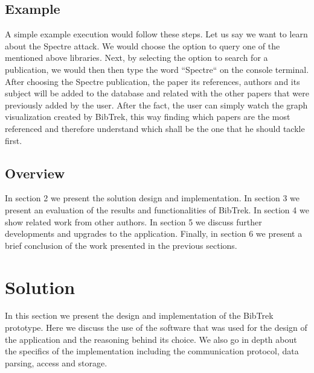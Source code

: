 \documentclass[twocolumn]{article}
\begin{document}
\subsection{Example}
A simple example execution would follow these steps. Let us say we want to learn about the Spectre attack. We would choose the option to query one of the mentioned above libraries. Next, by selecting the option to search for a publication, we would then then type the word ``Spectre`` on the console terminal. After choosing the Spectre publication, the paper its references, authors and its subject will be added to the database and related with the other papers that were previously added by the user. After the fact, the user can simply watch the graph visualization created by BibTrek, this way finding which papers are the most referenced and therefore understand which shall be the one that he should tackle first.


\subsection{Overview}
In section 2 we present the solution design and implementation. In section 3 we present an evaluation of the results and functionalities of BibTrek. In section 4 we show related work from other authors. In section 5 we discuss further developments and upgrades to the application. Finally, in section 6 we present a brief conclusion of the work presented in the previous sections. \\[1\baselineskip]


\section{Solution}

In this section we present the design and implementation of the BibTrek prototype. Here we discuss the use of the software that was used for the design of the application and the reasoning behind its choice. We also go in depth about the specifics of the implementation including the communication protocol, data parsing, access and storage.
\end{document}
